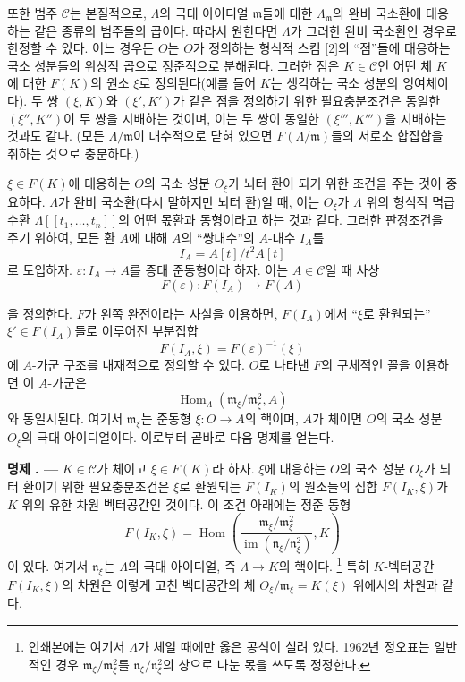 \documentclass[11pt,twoside,openany]{book}
\numberwithin{equation}{section}
\newcommand{\sourceunit}{front}
\newcommand{\src}[1]{%
  \phantomsection\hypertarget{src:\sourceunit:#1}{}%
  \marginpar{\raggedleft\footnotesize\sffamily #1}%
}
\theoremstyle{plain}
\theoremstyle{definition}
\theoremstyle{remark}
\newcommand{\result}[2]{%
  \par\medskip\noindent\textbf{#1%
  \if\relax\detokenize{#2}\relax\else\space#2\fi. ---}\enspace
}
\begin{document}
또한 범주 $\mathcal C$는 본질적으로, $\Lambda$의 극대 아이디얼
$\mathfrak m$들에 대한 $\Lambda_{\mathfrak m}$의 완비 국소환에 대응하는
같은 종류의 범주들의 곱이다. 따라서 원한다면 $\Lambda$가 그러한 완비
국소환인 경우로 한정할 수 있다. 어느 경우든 $O$는 $O$가 정의하는 형식적
스킴 [2]의 ``점''들에 대응하는 국소 성분들의 위상적 곱으로 정준적으로
분해된다. 그러한 점은 $K\in\mathcal C$인 어떤 체 $K$에 대한 $F(K)$의 원소
$\xi$로 정의된다(예를 들어 $K$는 생각하는 국소 성분의 잉여체이다). 두 쌍
$(\xi,K)$와 $(\xi',K')$가 같은 점을 정의하기 위한 필요충분조건은 동일한
$(\xi'',K'')$이 두 쌍을 지배하는 것이며, 이는 두 쌍이 동일한
$(\xi''',K''')$을 지배하는 것과도 같다. (모든 $\Lambda/\mathfrak m$이
대수적으로 닫혀 있으면 $F(\Lambda/\mathfrak m)$들의 서로소 합집합을
취하는 것으로 충분하다.)

$\xi\in F(K)$에 대응하는 $O$의 국소 성분 $O_\xi$가 뇌터 환이 되기 위한
조건을 주는 것이 중요하다. $\Lambda$가 완비 국소환(다시 말하지만
뇌터 환)일 때, 이는 $O_\xi$가 $\Lambda$ 위의 형식적 멱급수환
$\Lambda[[t_1,\ldots,t_n]]$의 어떤 몫환과 동형이라고 하는 것과 같다.
그러한 판정조건을 주기 위하여, 모든 환 $A$에 대해 $A$의 ``쌍대수''의
$A$-대수 $I_A$를
\[
  I_A=A[t]/t^2A[t]
\]
로 도입하자. $\varepsilon:I_A\longrightarrow A$를 증대 준동형이라 하자.
이는 $A\in\mathcal C$일 때 사상
\[
  F(\varepsilon):F(I_A)\longrightarrow F(A)
\]

\src{376}
을 정의한다. $F$가 왼쪽 완전이라는 사실을 이용하면, $F(I_A)$에서
``$\xi$로 환원되는'' $\xi'\in F(I_A)$들로 이루어진 부분집합
\[
  F(I_A,\xi)=F(\varepsilon)^{-1}(\xi)
\]
에 $A$-가군 구조를 내재적으로 정의할 수 있다. $O$로 나타낸 $F$의
구체적인 꼴을 이용하면 이 $A$-가군은
\[
  \operatorname{Hom}_{\Lambda}(\mathfrak m_\xi/\mathfrak m_\xi^2,A)
\]
와 동일시된다. 여기서 $\mathfrak m_\xi$는 준동형
$\xi:O\longrightarrow A$의 핵이며, $A$가 체이면 $O$의 국소 성분
$O_\xi$의 극대 아이디얼이다. 이로부터 곧바로 다음 명제를 얻는다.

\result{명제}{5.1} $K\in\mathcal C$가 체이고 $\xi\in F(K)$라 하자.
$\xi$에 대응하는 $O$의 국소 성분 $O_\xi$가 뇌터 환이기 위한
필요충분조건은 $\xi$로 환원되는 $F(I_K)$의 원소들의 집합
$F(I_K,\xi)$가 $K$ 위의 유한 차원 벡터공간인 것이다. 이 조건 아래에는
정준 동형
\[
  F(I_K,\xi)=
  \operatorname{Hom}\!\left(
    \frac{\mathfrak m_\xi/\mathfrak m_\xi^2}
         {\operatorname{im}(\mathfrak n_\xi/\mathfrak n_\xi^2)},K
  \right)
\]
이 있다. 여기서 $\mathfrak n_\xi$는 $\Lambda$의 극대 아이디얼, 즉
$\Lambda\longrightarrow K$의 핵이다.
\footnote{인쇄본에는 여기서 $\Lambda$가 체일 때에만 옳은 공식이 실려
있다. 1962년 정오표는 일반적인 경우 $\mathfrak m_\xi/\mathfrak m_\xi^2$를
$\mathfrak n_\xi/\mathfrak n_\xi^2$의 상으로 나눈 몫을 쓰도록 정정한다.}
특히 $K$-벡터공간 $F(I_K,\xi)$의 차원은 이렇게 고친 벡터공간의 체
$O_\xi/\mathfrak m_\xi=K(\xi)$ 위에서의 차원과 같다.
\end{document}
